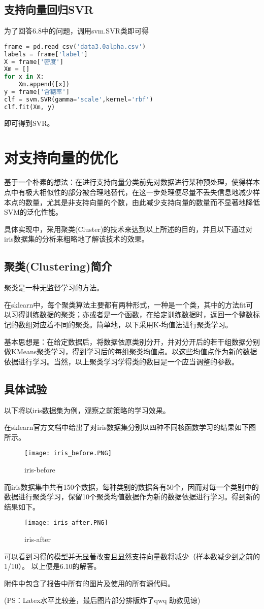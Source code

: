 \documentclass[UTF8]{ctexart}
\begin{document}
\subsection{支持向量回归SVR}
为了回答6.8中的问题，调用svm.SVR类即可得
\begin{lstlisting}[language = python]
frame = pd.read_csv('data3.0alpha.csv')
labels = frame['label']
X = frame['密度']
Xm = []
for x in X:
	Xm.append([x])
y = frame['含糖率']
clf = svm.SVR(gamma='scale',kernel='rbf')
clf.fit(Xm, y)
\end{lstlisting}
即可得到SVR。

\section{对支持向量的优化}
基于一个朴素的想法：在进行支持向量分类前先对数据进行某种预处理，使得样本点中有极大相似性的部分被合理地替代，在这一步处理便尽量不丢失信息地减少样本点的数量，尤其是非支持向量的个数，由此减少支持向量的数量而不显著地降低SVM的泛化性能。

具体实现中，采用聚类(Cluster)的技术来达到以上所述的目的，并且以下通过对iris数据集的分析来粗略地了解该技术的效果。
\subsection{聚类(Clustering)简介}
聚类是一种无监督学习的方法。

在sklearn中，每个聚类算法主要都有两种形式，一种是一个类，其中的方法fit可以习得训练数据的聚类；亦或者是一个函数，在给定训练数据时，返回一个整数标记的数组对应着不同的聚类。简单地，以下采用K-均值法进行聚类学习。

基本思想是：在给定数据后，将数据依原类别分开，并对分开后的若干组数据分别做KMeans聚类学习，得到学习后的每组聚类均值点。以这些均值点作为新的数据依据进行学习。当然，以上聚类学习学得类的数目是一个应当调整的参数。

\subsection{具体试验}
以下将以iris数据集为例，观察之前策略的学习效果。

在sklearn官方文档中给出了对iris数据集分别以四种不同核函数学习的结果如下图所示。
\begin{figure}[htbp]
	\centering
	\texttt{[image: iris\_before.PNG]}
	\caption{iris-before}
\end{figure}

而iris数据集中共有150个数据，每种类别的数据各有50个，因而对每一个类别中的数据进行聚类学习，保留10个聚类均值数据作为新的数据依据进行学习。得到新的结果如下。
\begin{figure}[htbp]
	\centering
	\texttt{[image: iris\_after.PNG]}
	\caption{iris-after}
\end{figure}

可以看到习得的模型并无显著改变且显然支持向量数将减少（样本数减少到之前的1/10）。
以上便是6.10的解答。

附件中包含了报告中所有的图片及使用的所有源代码。

(PS：Latex水平比较差，最后图片部分排版炸了qwq 助教见谅)
\end{document}
